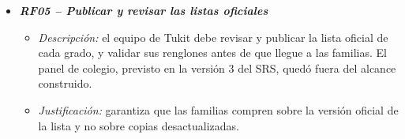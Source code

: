 \begin{itemize}
  \item \textbf{\textit{RF05 -- Publicar y revisar las listas oficiales}}
    \begin{itemize}
      \item \textit{Descripción:} el equipo de Tukit debe revisar y publicar la lista oficial de
            cada grado, y validar sus renglones antes de que llegue a las familias. El panel de
            colegio, previsto en la versión 3 del SRS, quedó fuera del alcance construido.
      \item \textit{Justificación:} garantiza que las familias compren sobre la versión
            oficial de la lista y no sobre copias desactualizadas.
    \end{itemize}
\end{itemize}
